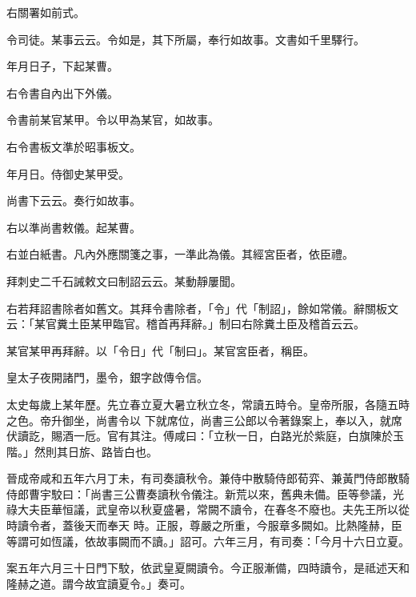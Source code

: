 \begin{pinyinscope}
 右關署如前式。



 令司徒。某事云云。令如是，其下所屬，奉行如故事。文書如千里驛行。



 年月日子，下起某曹。



 右令書自內出下外儀。



 令書前某官某甲。令以甲為某官，如故事。



 右令書板文準於昭事板文。



 年月日。侍御史某甲受。



 尚書下云云。奏行如故事。



 右以準尚書敕儀。起某曹。



 右並白紙書。凡內外應關箋之事，一準此為儀。其經宮臣者，依臣禮。



 拜刺史二千石誡敕文曰制詔云云。某動靜屢聞。



 右若拜詔書除者如舊文。其拜令書除者，「令」代「制詔」，餘如常儀。辭關板文云：「某官糞土臣某甲臨官。稽首再拜辭。」制曰右除糞土臣及稽首云云。



 某官某甲再拜辭。以「令日」代「制曰」。某官宮臣者，稱臣。



 皇太子夜開諸門，墨令，銀字啟傳令信。



 太史每歲上某年歷。先立春立夏大暑立秋立冬，常讀五時令。皇帝所服，各隨五時之色。帝升御坐，尚書令以
 下就席位，尚書三公郎以令著錄案上，奉以入，就席伏讀訖，賜酒一卮。官有其注。傅咸曰：「立秋一日，白路光於紫庭，白旗陳於玉階。」然則其日旂、路皆白也。



 晉成帝咸和五年六月丁未，有司奏讀秋令。兼侍中散騎侍郎荀弈、兼黃門侍郎散騎侍郎曹宇駮曰：「尚書三公曹奏讀秋令儀注。新荒以來，舊典未備。臣等參議，光祿大夫臣華恒議，武皇帝以秋夏盛暑，常闕不讀令，在春冬不廢也。夫先王所以從時讀令者，蓋後天而奉天
 時。正服，尊嚴之所重，今服章多闕如。比熱隆赫，臣等謂可如恆議，依故事闕而不讀。」詔可。六年三月，有司奏：「今月十六日立夏。



 案五年六月三十日門下駮，依武皇夏闕讀令。今正服漸備，四時讀令，是祗述天和隆赫之道。謂今故宜讀夏令。」奏可。




\end{pinyinscope}
